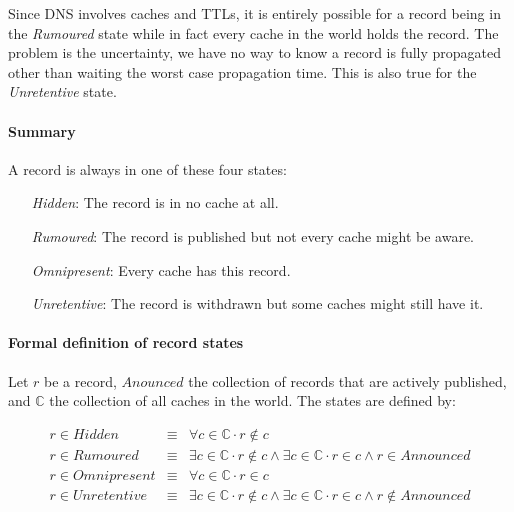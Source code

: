 \documentclass[twoside, a4paper]{article}
\begin{document}
Since DNS involves caches and TTLs, it is entirely possible for a 
record being in the \emph{Rumoured} state while in fact every cache 
in the world holds the record. The problem is the uncertainty, we 
have no way to know a record is fully propagated other than waiting 
the worst case propagation time. This is also true for the \emph
{Unretentive} state.

\paragraph{Summary} A record is always in one of these four states:

\begin{itemize}
\item[\emph{Hidden}:] 		
			The record is in no cache at all.
\item[\emph{Rumoured}:] 		
			The record is published but not every cache might be aware.
\item[\emph{Omnipresent}:]
			Every cache has this record.
\item[\emph{Unretentive}:]
			The record is withdrawn but some caches might still have it.
\end{itemize} 

\paragraph{Formal definition of record states} Let $r$ be a record, 
$Anounced$ the collection of records that are actively published, 
and $\mathbb{C}$ the collection of all caches in the world. The 
states are defined by:

\begin{displaymath}
\begin{array}{lllll}
       r\in Hidden      & \equiv & \forall c \in \mathbb{C} \cdot r \not \in c \\
       r\in Rumoured    & \equiv & \exists c \in \mathbb{C} \cdot r \not \in c \wedge \exists c \in \mathbb{C} \cdot r\in c \wedge r\in Announced\\
       r\in Omnipresent & \equiv & \forall c \in \mathbb{C} \cdot r \in c \\
       r\in Unretentive & \equiv & \exists c \in \mathbb{C} \cdot r \not \in c \wedge \exists c \in \mathbb{C} \cdot r \in c \wedge r \notin Announced \\
\end{array}
\end{displaymath}
\end{document}
